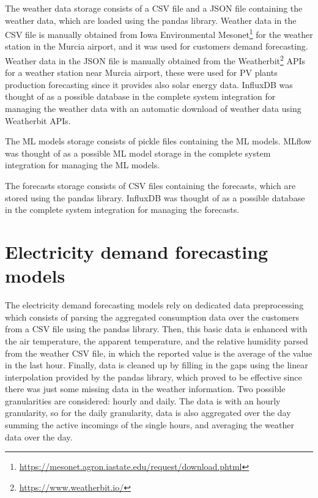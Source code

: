 The weather data storage consists of a CSV file and a JSON file containing the weather data, which are loaded using the pandas library.
Weather data in the CSV file is manually obtained from Iowa Environmental Mesonet\footnote{ \url{https://mesonet.agron.iastate.edu/request/download.phtml} } for the weather station in the Murcia airport, and it was used for customers demand forecasting.
Weather data in the JSON file is manually obtained from the Weatherbit\footnote{ \url{https://www.weatherbit.io/} } APIs for a weather station near Murcia airport, these were used for PV plants production forecasting since it provides also solar energy data.
InfluxDB was thought of as a possible database in the complete system integration for managing the weather data with an automatic download of weather data using Weatherbit APIs.

The ML models storage consists of pickle files containing the ML models.
MLflow was thought of as a possible ML model storage in the complete system integration for managing the ML models.

The forecasts storage consists of CSV files containing the forecasts, which are stored using the pandas library.
InfluxDB was thought of as a possible database in the complete system integration for managing the forecasts.


\section{Electricity demand forecasting models}
\label{sec:demandimpl}
\vspace{0.2 cm}

The electricity demand forecasting models rely on dedicated data preprocessing which consists of parsing the aggregated consumption data over the customers from a CSV file using the pandas library.
Then, this basic data is enhanced with the air temperature, the apparent temperature, and the relative humidity parsed from the weather CSV file, in which the reported value is the average of the value in the last hour.
Finally, data is cleaned up by filling in the gaps using the linear interpolation provided by the pandas library, which proved to be effective since there was just some missing data in the weather information.
Two possible granularities are considered: hourly and daily.
The data is with an hourly granularity, so for the daily granularity, data is also aggregated over the day summing the active incomings of the single hours, and averaging the weather data over the day.

